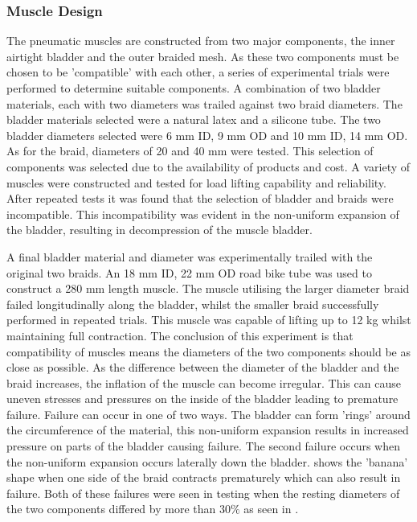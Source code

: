 \documentclass[11pt,a4paper]{article}
\begin{document}
\subsubsection{Muscle Design}
\label{subsubsection:muscle_design}
The pneumatic muscles are constructed from two major components, the inner airtight bladder and the outer braided mesh. As these two components must be chosen to be 'compatible' with each other, a series of experimental trials were performed to determine suitable components. A combination of two bladder materials, each with two diameters was trailed against two braid diameters. The bladder materials selected were a natural latex and a silicone tube. The two bladder diameters selected were 6 mm ID, 9 mm OD and 10 mm ID, 14 mm OD. As for the braid, diameters of 20 and 40 mm were tested. This selection of components was selected due to the availability of products and cost. A variety of muscles were constructed and tested for load lifting capability and reliability. After repeated tests it was found that the selection of bladder and braids were incompatible. This incompatibility was evident in the non-uniform expansion of the bladder, resulting in decompression of the muscle bladder. \newline

A final bladder material and diameter was experimentally trailed with the original two braids. An 18 mm ID, 22 mm OD road bike tube was used to construct a 280 mm length muscle. The muscle utilising the larger diameter braid failed longitudinally along the bladder, whilst the smaller braid successfully performed in repeated trials. This muscle was capable of lifting up to 12 kg whilst maintaining full contraction.\newline
The conclusion of this experiment is that compatibility of muscles means the diameters of the two components should be as close as possible. As the difference between the diameter of the bladder and the braid increases, the inflation of the muscle can become irregular. This can cause uneven stresses and pressures on the inside of the bladder leading to premature failure. Failure can occur in one of two ways. The bladder can form 'rings'  around the circumference of the material, this non-uniform expansion results in increased pressure on parts of the bladder causing failure. The second failure occurs when the non-uniform expansion occurs laterally down the bladder.  shows the 'banana' shape when one side of the braid contracts prematurely which can also result in failure. Both of these failures were seen in testing when the resting diameters of the two components differed by more than $30\%$ as seen in .
\end{document}
